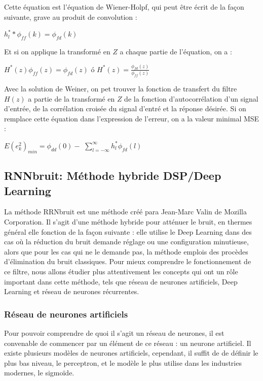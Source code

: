 \documentclass[conference,onecolumn]{IEEEtran}
\begin{document}
Cette équation est l’équation de Wiener-Holpf, qui peut être écrit de la façon suivante, grave au produit de convolution :

\begin{center}
     $h_l^* * \phi_{ff} (k) = \phi_{fd} (k)$
\end{center}
Et si on applique la transformé en $Z$ a chaque partie de l’équation, on a :

\begin{center}
     $H^*(z) \phi_{ff}(z)=\phi_{fd}(z)$  ó  $H^*(z)=\frac{\phi_{fd}(z)}{\phi_{ff}(z)}$
\end{center}

Avec la solution de Weiner, on pet trouver la fonction de transfert du filtre $H(z)$ a partie de la transformé en $Z$ de la fonction d’autocorrélation d’un signal d’entrée, de la corrélation croisée du signal d’entré et la réponse désirée. Si on remplace cette équation dans l’expression de l’erreur, on a la valeur minimal MSE :

\begin{center}
     $E(e_k^2)_{min}=\phi_{dd}(0)-$ $\displaystyle\sum_{l= -\infty}^{\infty}h_l^* \phi_{fd}(l)$
\end{center}


\subsection{\textbf{RNNbruit: Méthode hybride DSP/Deep Learning}}
La méthode RRNbruit est une méthode créé para Jean-Marc Valin de Mozilla Corporation. Il s’agit d’une méthode hybride pour atténuer le bruit, en thermes général elle fonction de la façon suivante : elle utilise le Deep Learning dans des cas où la réduction du bruit demande réglage ou une configuration minutieuse, alors que pour les cas qui ne le demande pas, la méthode emplois des procèdes d’élimination du bruit classiques. Pour mieux comprendre le fonctionnement de ce filtre, nous allons étudier plus attentivement les concepts qui ont un rôle important dans cette méthode, tels que réseau de neurones artificiels, Deep Learning et réseau de neurones récurrentes.
\hfill\\

\subsubsection{Réseau de neurones artificiels}
Pour pouvoir comprendre de quoi il s’agit un réseau de neurones, il est convenable de commencer par un élément de ce réseau : un neurone artificiel. Il existe plusieurs modèles de neurones artificiels, cependant, il suffit de de définir le plus bas niveau, le perceptron, et le modèle le plus utilise dans les industries modernes, le sigmoïde. 
\hfill\\
\end{document}
